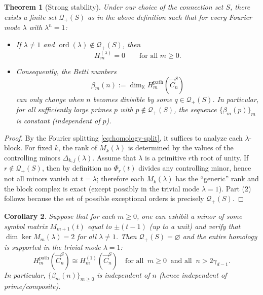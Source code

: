 \documentclass[11pt]{amsart}
\newcommand{\K}{\mathbb K}
\theoremstyle{plain}
\newtheorem{theorem}{Theorem}[section]
\newtheorem{corollary}[theorem]{Corollary}
\theoremstyle{definition}
\numberwithin{equation}{section}
\begin{document}
\begin{theorem}[Strong stability]\label{thm:strong-stability}
Under our choice of the connection set $S$, there exists a finite set $\mathcal Q_+(S)$ as in the above definition such that for every Fourier mode $\lambda$ with $\lambda^n=1$:
\begin{itemize}
\item[(1)] If $\lambda\neq 1$ and $\operatorname{ord}(\lambda)\notin \mathcal Q_+(S)$, then
\[
H_m^{(\lambda)}=0\qquad\text{for all }m\ge 0.
\]
\item[(2)] Consequently, the Betti numbers
\[
\beta_m(n):=\dim_\K H_m^{\mathrm{path}}(\vec{C}_n^S)
\]
can only change when $n$ becomes divisible by some $q\in\mathcal Q_+(S)$.
In particular, for all sufficiently large primes $p$ with $p\notin \mathcal Q_+(S)$, the sequence $\{\beta_m(p)\}_m$ is
constant (independent of $p$).
\end{itemize}
\end{theorem}

\begin{proof}
By the Fourier splitting \eqref{eq:homology-split}, it suffices to analyze each $\lambda$-block. For fixed $k$, the rank of
$M_k(\lambda)$ is determined by the values of the controlling minors $\Delta_{k,j}(\lambda)$.
Assume that $\lambda$ is a primitive $r$th root of unity. If $r\notin\mathcal Q_+(S)$, then
by definition no $\Phi_r(t)$ divides any controlling minor, hence not all minors vanish at $t=\lambda$; therefore each
$M_k(\lambda)$ has the ``generic'' rank and the block complex is exact (except possibly in the trivial mode $\lambda=1$).
Part (2) follows because the set of possible exceptional orders is precisely $\mathcal Q_+(S)$.
\end{proof}


\begin{corollary}\label{cor:sufficient}
Suppose that for each $m\ge 0$, one can exhibit a minor of some symbol matrix
$M_{m+1}(t)$ equal to $\pm(t-1)$ (up to a unit) and verify that $\dim\ker M_m(\lambda)=2$ for all $\lambda\neq 1$.
Then $\mathcal Q_+(S)=\varnothing$ and the entire homology is supported in the trivial mode $\lambda=1$:
\[
H_m^{\mathrm{path}}(\vec{C}_n^S)\cong H_m^{(1)}(\vec{C}_n^S)\quad\text{for all }~m\ge 0~\text{ and all }~n>2\gamma_{d-1}.
\]
In particular, $\{\beta_m(n)\}_{m\ge 0}$ is independent of $n$ (hence independent of prime/composite).
\end{corollary}
\end{document}
